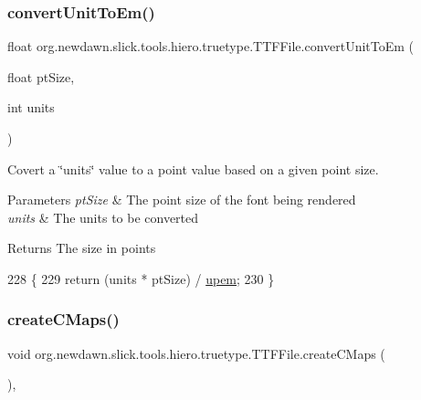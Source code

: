 \subsubsection{\texorpdfstring{convert\+Unit\+To\+Em()}{convertUnitToEm()}}
{\footnotesize\ttfamily float org.\+newdawn.\+slick.\+tools.\+hiero.\+truetype.\+T\+T\+F\+File.\+convert\+Unit\+To\+Em (\begin{DoxyParamCaption}\item[{float}]{pt\+Size,  }\item[{int}]{units }\end{DoxyParamCaption})\hspace{0.3cm}{\ttfamily [inline]}}

Covert a \char`\"{}units\char`\"{} value to a point value based on a given point size.


\begin{DoxyParams}{Parameters}
{\em pt\+Size} & The point size of the font being rendered \\
\hline
{\em units} & The units to be converted \\
\hline
\end{DoxyParams}
\begin{DoxyReturn}{Returns}
The size in points 
\end{DoxyReturn}

\begin{DoxyCode}
228                                                           \{
229         \textcolor{keywordflow}{return} (units * ptSize) / \mbox{\hyperlink{classorg_1_1newdawn_1_1slick_1_1tools_1_1hiero_1_1truetype_1_1_t_t_f_file_a8250ffa3465ce98f553e94c1dec0287f}{upem}};
230     \}
\end{DoxyCode}
\mbox{\label{classorg_1_1newdawn_1_1slick_1_1tools_1_1hiero_1_1truetype_1_1_t_t_f_file_a46ab09656217dead7e00e6bfc6ace9c9}} 
\subsubsection{\texorpdfstring{create\+C\+Maps()}{createCMaps()}}
{\footnotesize\ttfamily void org.\+newdawn.\+slick.\+tools.\+hiero.\+truetype.\+T\+T\+F\+File.\+create\+C\+Maps (\begin{DoxyParamCaption}{ }\end{DoxyParamCaption})\hspace{0.3cm}{\ttfamily [inline]}, {\ttfamily [private]}}

